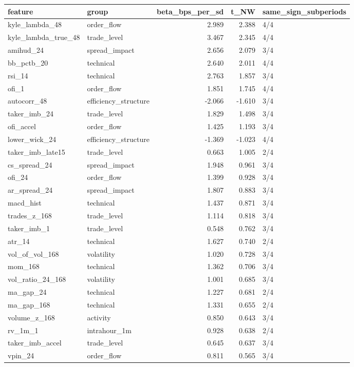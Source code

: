 \begin{tabular}{llrrl}
\toprule
feature & group & beta_bps_per_sd & t_NW & same_sign_subperiods \\
\midrule
kyle_lambda_48 & order_flow & 2.989 & 2.388 & 4/4 \\
kyle_lambda_true_48 & trade_level & 3.467 & 2.345 & 4/4 \\
amihud_24 & spread_impact & 2.656 & 2.079 & 3/4 \\
bb_pctb_20 & technical & 2.640 & 2.011 & 4/4 \\
rsi_14 & technical & 2.763 & 1.857 & 3/4 \\
ofi_1 & order_flow & 1.851 & 1.745 & 4/4 \\
autocorr_48 & efficiency_structure & -2.066 & -1.610 & 3/4 \\
taker_imb_24 & trade_level & 1.829 & 1.498 & 3/4 \\
ofi_accel & order_flow & 1.425 & 1.193 & 3/4 \\
lower_wick_24 & efficiency_structure & -1.369 & -1.023 & 4/4 \\
taker_imb_late15 & trade_level & 0.663 & 1.005 & 2/4 \\
cs_spread_24 & spread_impact & 1.948 & 0.961 & 3/4 \\
ofi_24 & order_flow & 1.399 & 0.928 & 3/4 \\
ar_spread_24 & spread_impact & 1.807 & 0.883 & 3/4 \\
macd_hist & technical & 1.437 & 0.871 & 3/4 \\
trades_z_168 & trade_level & 1.114 & 0.818 & 3/4 \\
taker_imb_1 & trade_level & 0.548 & 0.762 & 3/4 \\
atr_14 & technical & 1.627 & 0.740 & 2/4 \\
vol_of_vol_168 & volatility & 1.020 & 0.728 & 3/4 \\
mom_168 & technical & 1.362 & 0.706 & 3/4 \\
vol_ratio_24_168 & volatility & 1.001 & 0.685 & 3/4 \\
ma_gap_24 & technical & 1.227 & 0.681 & 2/4 \\
ma_gap_168 & technical & 1.331 & 0.655 & 2/4 \\
volume_z_168 & activity & 0.850 & 0.643 & 3/4 \\
rv_1m_1 & intrahour_1m & 0.928 & 0.638 & 2/4 \\
taker_imb_accel & trade_level & 0.645 & 0.637 & 3/4 \\
vpin_24 & order_flow & 0.811 & 0.565 & 3/4 \\

\end{tabular}
